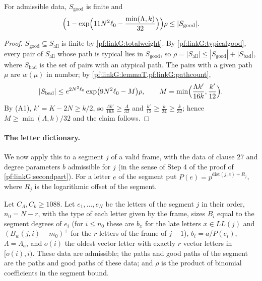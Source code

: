 \begin{proposition}[Lemma T]\label{pf:linkG:lemT}
For admissible data, $S_{\mathrm{good}}$ is finite and
\[
\Bigl(1-\exp\Bigl(11N^2\ell_0-\frac{\min(\Lambda,k)}{32}\Bigr)\Bigr)\rho\le|S_{\mathrm{good}}| .
\]
\end{proposition}

\begin{proof}
$S_{\mathrm{good}}\subseteq S_{\mathrm{all}}$ is finite by \cref{pf:linkG:totalweight}. By \cref{pf:linkG:typicalgood}, every pair of
$S_{\mathrm{all}}$ whose path is typical lies in $S_{\mathrm{good}}$, so $\rho=|S_{\mathrm{all}}|\le|S_{\mathrm{good}}|+|S_{\mathrm{bad}}|$, where
$S_{\mathrm{bad}}$ is the set of pairs with an atypical path. The pairs with a given path $\mu$ are $w(\mu)$ in number; by
\cref{pf:linkG:lemmaT,pf:linkG:pathcount},
\[
|S_{\mathrm{bad}}|\le e^{2N^2\ell_0}\exp\bigl(9N^2\ell_0-M\bigr)\rho,\qquad M=\min\Bigl(\frac{\Lambda k'}{16k},\frac{k'}{12}\Bigr).
\]
By (A1), $k'=K-2N\ge k/2$, so $\frac{\Lambda k'}{16k}\ge\frac\Lambda{32}$ and $\frac{k'}{12}\ge\frac k{24}\ge\frac k{32}$; hence
$M\ge\min(\Lambda,k)/32$ and the claim follows.
\end{proof}

\paragraph{The letter dictionary.} We now apply this to a segment $j$ of a valid frame, with the data of clause 27 and degree
parameters $b$ admissible for $j$ (in the sense of Step 4 of the proof of \cref{pf:linkG:secondpart}). For a letter $e$ of the
segment put $P(e)=p^{\mathrm{dist}(j,e)+R_j}$, where $R_j$ is the logarithmic offset of the segment.

\begin{lemma}\label{pf:linkG:dictionary}
Let $C_\Lambda,C_k\ge1088$. Let $e_1,\dots,e_N$ be the letters of the segment $j$ in their order, $n_0=N-r$, with the type of
each letter given by the frame, sizes $B_i$ equal to the segment degrees of $e_i$ (for $i\le n_0$ these are $b_x$ for the late
letters $x\in LL(j)$ and $(B_w(j,i)-m_0)^+$ for the $r$ letters of the frame of $j-1$), $b_i=a/P(e_i)$, $\Lambda=\Lambda_a$, and $o(i)$
the oldest vector letter with exactly $r$ vector letters in $[o(i),i)$. These data are admissible; the paths and good paths of the
segment are the paths and good paths of these data; and $\rho$ is the product of binomial coefficients in the segment bound.
\end{lemma}

